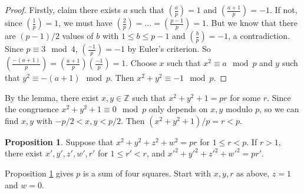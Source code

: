 \documentclass{article}
\newcommand{\Z}{\mathbb{Z}}
\newcommand{\rb}[1]{\left( #1 \right)}
\newcommand{\legendre}[2]{\rb{\tfrac{#1}{#2}}}
\theoremstyle{definition}\newtheorem{definition}{Definition}
\theoremstyle{definition}\newtheorem*{remark}{Remark}
\theoremstyle{definition}\newtheorem*{example}{Example}
\theoremstyle{definition}\newtheorem*{note}{Note}
\newtheorem{proposition}[definition]{Proposition}
\begin{document}
\begin{proof}
Firstly, claim there exists $ a $ such that $ \legendre{a}{p} = 1 $ and $ \legendre{a + 1}{p} = -1 $. If not, since $ \legendre{1}{p} = 1 $, we must have $ \legendre{2}{p} = \dots = \legendre{p - 1}{p} = 1 $. But we know that there are $ \rb{p - 1} / 2 $ values of $ b $ with $ 1 \le b \le p - 1 $ and $ \legendre{b}{p} = -1 $, a contradiction. Since $ p \equiv 3 \mod 4 $, $ \legendre{-1}{p} = -1 $ by Euler's criterion. So $ \legendre{-\rb{a + 1}}{p} = \legendre{a + 1}{p}\legendre{-1}{p} = 1 $. Choose $ x $ such that $ x^2 \equiv a \mod p $ and $ y $ such that $ y^2 \equiv -\rb{a + 1} \mod p $. Then $ x^2 + y^2 \equiv -1 \mod p $.
\end{proof}

By the lemma, there exist $ x, y \in \Z $ such that $ x^2 + y^2 + 1 = pr $ for some $ r $. Since the congruence $ x^2 + y^2 + 1 \equiv 0 \mod p $ only depends on $ x, y $ modulo $ p $, so we can find $ x, y $ with $ -p / 2 < x, y < p / 2 $. Then $ \rb{x^2 + y^2 + 1} / p = r < p $.

\begin{proposition}
\label{prop:55}
Suppose that $ x^2 + y^2 + z^2 + w^2 = pr $ for $ 1 \le r < p $. If $ r > 1 $, there exist $ x', y', z', w', r' $ for $ 1 \le r' < r $, and $ x'^2 + y'^2 + z'^2 + w'^2 = pr' $.
\end{proposition}

Proposition \ref{prop:55} gives $ p $ is a sum of four squares. Start with $ x, y, r $ as above, $ z = 1 $ and $ w = 0 $.
\end{document}
